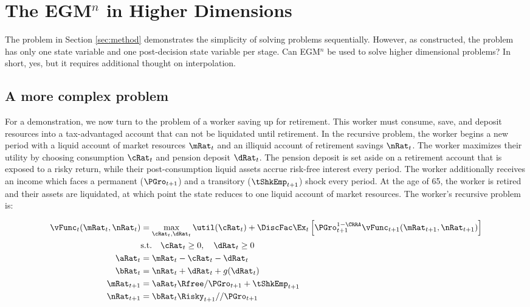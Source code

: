 \documentclass[\econtexRoot/SequentialEGM]{subfiles}
\begin{document}
\hypertarget{higher-dimensions}{}
\par\section{The EGM$^n$ in Higher Dimensions}
\notinsubfile{\label{sec:higherdims}}

The problem in Section \ref{sec:method} demonstrates the simplicity of solving problems sequentially. However, as constructed, the problem has only one state variable and one post-decision state variable per stage. Can EGM$^n$ be used to solve higher dimensional problems? In short, yes, but it requires additional thought on interpolation.

\subsection{A more complex problem}

For a demonstration, we now turn to the problem of a worker saving up for retirement. This worker must consume, save, and deposit resources into a tax-advantaged account that can not be liquidated until retirement. In the recursive problem, the worker begins a new period with a liquid account of market resources $\mRat_{t}$ and an illiquid account of retirement savings $\nRat_{t}$. The worker maximizes their utility by choosing consumption $\cRat_{t}$ and pension deposit $\dRat_{t}$. The pension deposit is set aside on a retirement account that is exposed to a risky return, while their post-consumption liquid assets accrue risk-free interest every period. The worker additionally receives an income which faces a permanent ($\PGro_{t+1}$) and a transitory ($\tShkEmp_{t+1}$) shock every period. At the age of 65, the worker is retired and their assets are liquidated, at which point the state reduces to one liquid account of market resources. The worker's recursive problem is:

\begin{equation}
	\begin{split}
		\vFunc_{t}(\mRat_{t}, \nRat_{t}) & = \max_{\cRat_{t}, \dRat_{t}} \util(\cRat_{t}) + \DiscFac \Ex_{t} \left[ \PGro_{t+1}^{1-\CRRA} \vFunc_{t+1}(\mRat_{t+1}, \nRat_{t+1}) \right] \\
		& \text{s.t.} \quad \cRat_{t} \ge 0, \quad \dRat_{t} \ge 0 \\
		\aRat_{t} & = \mRat_{t} - \cRat_{t} - \dRat_{t} \\
		\bRat_{t} & = \nRat_{t} + \dRat_{t} + g(\dRat_{t}) \\
		\mRat_{t+1} & = \aRat_{t} \Rfree / \PGro_{t+1}  + \tShkEmp_{t+1} \\
		\nRat_{t+1} & = \bRat_{t} \Risky_{t+1} / / \PGro_{t+1}
	\end{split}
\end{equation}
\end{document}
